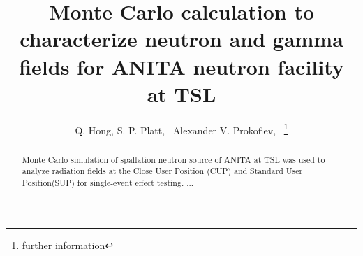 \documentclass[12pt,journal]{IEEEtran}
\begin{document}
\title{Monte Carlo calculation to characterize neutron and gamma fields for ANITA neutron facility at TSL}

\author{Q. Hong,
S. P. Platt,~
Alexander V. Prokofiev,~
\thanks{further information}\\[2mm] 	%
\vspace{-5mm}
}



\maketitle %

\begin{abstract}
Monte Carlo simulation of spallation neutron source of ANITA at TSL was used to analyze radiation fields at the Close User Position (CUP) and Standard User Position(SUP) for single-event effect testing. ...
\end{abstract}




\IEEEpeerreviewmaketitle
\end{document}
